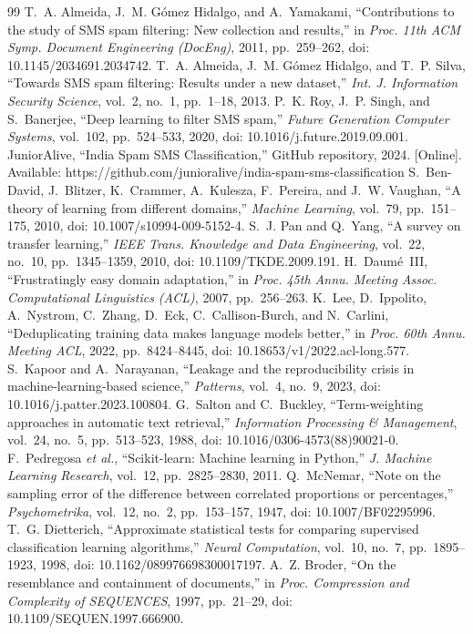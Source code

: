 \documentclass[conference]{IEEEtran}
\begin{document}
\balance
\begin{thebibliography}{99}
 T.~A. Almeida, J.~M. G\'omez Hidalgo, and A.~Yamakami, ``Contributions to the study of SMS spam filtering: New collection and results,'' in \textit{Proc. 11th ACM Symp. Document Engineering (DocEng)}, 2011, pp.~259--262, doi: 10.1145/2034691.2034742.
 T.~A. Almeida, J.~M. G\'omez Hidalgo, and T.~P. Silva, ``Towards SMS spam filtering: Results under a new dataset,'' \textit{Int. J. Information Security Science}, vol.~2, no.~1, pp.~1--18, 2013.
 P.~K. Roy, J.~P. Singh, and S.~Banerjee, ``Deep learning to filter SMS spam,'' \textit{Future Generation Computer Systems}, vol.~102, pp.~524--533, 2020, doi: 10.1016/j.future.2019.09.001.
 JuniorAlive, ``India Spam SMS Classification,'' GitHub repository, 2024. [Online]. Available: https://github.com/junioralive/india-spam-sms-classification
 S.~Ben-David, J.~Blitzer, K.~Crammer, A.~Kulesza, F.~Pereira, and J.~W. Vaughan, ``A theory of learning from different domains,'' \textit{Machine Learning}, vol.~79, pp.~151--175, 2010, doi: 10.1007/s10994-009-5152-4.
 S.~J. Pan and Q.~Yang, ``A survey on transfer learning,'' \textit{IEEE Trans. Knowledge and Data Engineering}, vol.~22, no.~10, pp.~1345--1359, 2010, doi: 10.1109/TKDE.2009.191.
 H.~Daum\'e~III, ``Frustratingly easy domain adaptation,'' in \textit{Proc. 45th Annu. Meeting Assoc. Computational Linguistics (ACL)}, 2007, pp.~256--263.
 K.~Lee, D.~Ippolito, A.~Nystrom, C.~Zhang, D.~Eck, C.~Callison-Burch, and N.~Carlini, ``Deduplicating training data makes language models better,'' in \textit{Proc. 60th Annu. Meeting ACL}, 2022, pp.~8424--8445, doi: 10.18653/v1/2022.acl-long.577.
 S.~Kapoor and A.~Narayanan, ``Leakage and the reproducibility crisis in machine-learning-based science,'' \textit{Patterns}, vol.~4, no.~9, 2023, doi: 10.1016/j.patter.2023.100804.
 G.~Salton and C.~Buckley, ``Term-weighting approaches in automatic text retrieval,'' \textit{Information Processing \& Management}, vol.~24, no.~5, pp.~513--523, 1988, doi: 10.1016/0306-4573(88)90021-0.
 F.~Pedregosa \textit{et al.}, ``Scikit-learn: Machine learning in Python,'' \textit{J. Machine Learning Research}, vol.~12, pp.~2825--2830, 2011.
 Q.~McNemar, ``Note on the sampling error of the difference between correlated proportions or percentages,'' \textit{Psychometrika}, vol.~12, no.~2, pp.~153--157, 1947, doi: 10.1007/BF02295996.
 T.~G. Dietterich, ``Approximate statistical tests for comparing supervised classification learning algorithms,'' \textit{Neural Computation}, vol.~10, no.~7, pp.~1895--1923, 1998, doi: 10.1162/089976698300017197.
 A.~Z. Broder, ``On the resemblance and containment of documents,'' in \textit{Proc. Compression and Complexity of SEQUENCES}, 1997, pp.~21--29, doi: 10.1109/SEQUEN.1997.666900.
\end{thebibliography}
\end{document}
